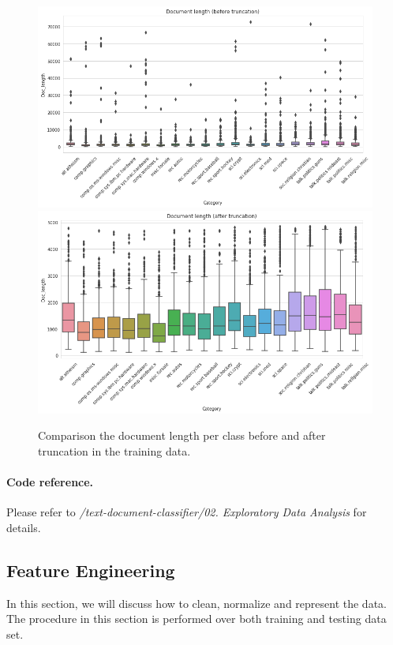 \documentclass[11pt]{article}
\theoremstyle{remark}
\begin{document}
\begin{figure}[t]
 \begin{center}
	\includegraphics[width=14cm]{figs/fig3_length_bf_truncation.png} \\
	\includegraphics[width=14cm]{figs/fig3_length_after_truncation.png}
  \end{center}
  \caption{Comparison the document length per class before and after truncation in the training data.}
  \label{fig:bf-vs-after-truncation}
 \end{figure}
 
\paragraph{Code reference.}
Please refer to {\em /text-document-classifier/02. Exploratory Data Analysis} for details.

\subsection{Feature Engineering} \label{sec:fea-eng}
In this section, we will discuss how to clean, normalize and represent the data.  The procedure in this section is performed over both training and testing data set.
\end{document}
